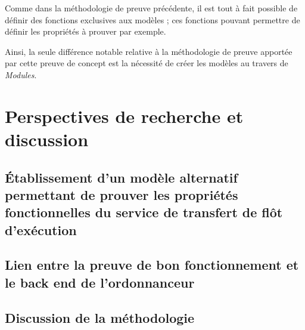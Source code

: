 		Comme dans la méthodologie de preuve précédente, il est tout à fait possible de définir des fonctions exclusives aux modèles ; ces fonctions pouvant permettre de définir les propriétés à prouver par exemple.

		Ainsi, la seule différence notable relative à la méthodologie de preuve apportée par cette preuve de concept est la nécessité de créer les modèles au travers de \emph{Modules}.

	\section{Perspectives de recherche et discussion}
		\subsection{Établissement d'un modèle alternatif permettant de prouver les propriétés fonctionnelles du service de transfert de flôt d'exécution}
		\subsection{Lien entre la preuve de bon fonctionnement et le back end de l'ordonnanceur}
		\subsection{Discussion de la méthodologie}
